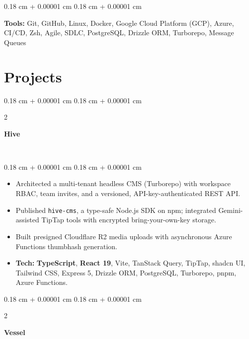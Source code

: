 \documentclass[10pt, letterpaper]{article}
\newenvironment{highlights}{
    \begin{itemize}[
        topsep=0.09 cm,
        parsep=0.09 cm,
        partopsep=0pt,
        itemsep=0pt,
        leftmargin=0.4 cm + 10pt
    ]
}{
    \end{itemize}
} %
\newenvironment{onecolentry}{
    \begin{adjustwidth}{
        0.18 cm + 0.00001 cm
    }{
        0.18 cm + 0.00001 cm
    }
}{
    \end{adjustwidth}
} %
\newenvironment{twocolentry}[2][]{
    \onecolentry
    \def\secondColumn{#2}
    \setcolumnwidth{\fill, 4.5 cm}
    \begin{paracol}{2}
}{
    \switchcolumn \raggedleft \secondColumn
    \end{paracol}
    \endonecolentry
} %
\let\hrefWithoutArrow\href
\renewcommand{\href}[2]{\hrefWithoutArrow{#1}{\ifthenelse{\equal{#2}{}}{ }{#2 }\raisebox{.15ex}{\footnotesize \faExternalLink*}}}
\begin{document}
        \vspace{0.05 cm}

        \begin{onecolentry}
            \textbf{Tools:} Git, GitHub, Linux, Docker, Google Cloud Platform (GCP), Azure, CI/CD, Zsh, Agile, SDLC, PostgreSQL, Drizzle ORM, Turborepo, Message Queues
        \end{onecolentry}

\section{Projects}

\begin{twocolentry}{
\href{https://hivecms.online}{\faGlobe} \ \href{https://github.com/ni3rav/hive}{\faGithub}
}
    \textbf{Hive}
\end{twocolentry}

\vspace{0.02 cm}
\begin{onecolentry}
    \begin{highlights}
        \item Architected a multi-tenant headless CMS (Turborepo) with workspace RBAC, team invites, and a versioned, API-key-authenticated REST API.
        \item Published \texttt{hive-cms}, a type-safe Node.js SDK on npm; integrated Gemini-assisted TipTap tools with encrypted bring-your-own-key storage.
        \item Built presigned Cloudflare R2 media uploads with asynchronous Azure Functions thumbhash generation.
        \item \textbf{Tech:} \textbf{TypeScript}, \textbf{React 19}, Vite, TanStack Query, TipTap, shadcn UI, Tailwind CSS, Express 5, Drizzle ORM, PostgreSQL, Turborepo, pnpm, Azure Functions.
    \end{highlights}
\end{onecolentry}

\vspace{0.05 cm}

\begin{twocolentry}{
\href{https://vessel-web-kappa.vercel.app/}{\faGlobe} \ \href{https://github.com/ni3rav/vessel}{\faGithub}
}
    \textbf{Vessel}
\end{twocolentry}
\end{document}
